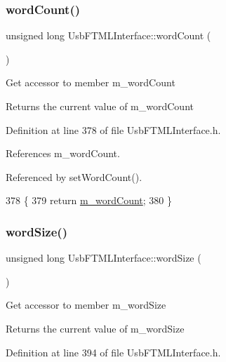\subsubsection{\texorpdfstring{word\+Count()}{wordCount()}}
{\footnotesize\ttfamily unsigned long Usb\+F\+T\+M\+L\+Interface\+::word\+Count (\begin{DoxyParamCaption}{ }\end{DoxyParamCaption})\hspace{0.3cm}{\ttfamily [inline]}}

Get accessor to member m\+\_\+word\+Count \begin{DoxyReturn}{Returns}
the current value of m\+\_\+word\+Count 
\end{DoxyReturn}


Definition at line 378 of file Usb\+F\+T\+M\+L\+Interface.\+h.



References m\+\_\+word\+Count.



Referenced by set\+Word\+Count().


\begin{DoxyCode}
378                              \{
379     \textcolor{keywordflow}{return} \hyperlink{classUsbFTMLInterface_ab7f4399ef367c08ffe1f7034f133986e}{m\_wordCount};
380   \}
\end{DoxyCode}
\mbox{\label{classUsbFTMLInterface_ac313f412cbda6222ef817cb46083e2b3}} 
\subsubsection{\texorpdfstring{word\+Size()}{wordSize()}}
{\footnotesize\ttfamily unsigned long Usb\+F\+T\+M\+L\+Interface\+::word\+Size (\begin{DoxyParamCaption}{ }\end{DoxyParamCaption})\hspace{0.3cm}{\ttfamily [inline]}}

Get accessor to member m\+\_\+word\+Size \begin{DoxyReturn}{Returns}
the current value of m\+\_\+word\+Size 
\end{DoxyReturn}


Definition at line 394 of file Usb\+F\+T\+M\+L\+Interface.\+h.



